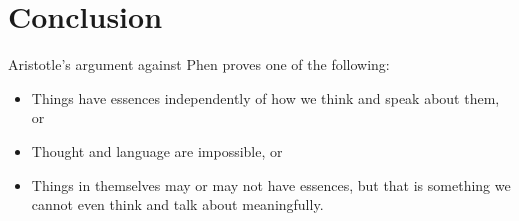 \documentclass[article,oneside]{memoir}
\begin{document}
\section{Conclusion}

Aristotle's argument against Phen proves one of the following: 

\begin{itemize}
\item Things have essences independently of how we think and speak about them, or
\item Thought and language are impossible, or
\item Things in themselves may or may not have essences, but that is something we cannot even think and talk about meaningfully. 
\end{itemize}
\end{document}

